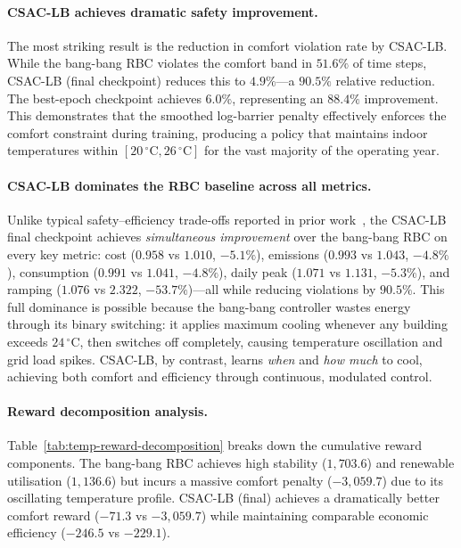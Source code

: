 \paragraph{CSAC-LB achieves dramatic safety improvement.}
The most striking result is the reduction in comfort violation rate by CSAC-LB.
While the bang-bang RBC violates the comfort band in $51.6\%$ of time steps,
CSAC-LB (final checkpoint) reduces this to $4.9\%$---a $90.5\%$ relative
reduction.  The best-epoch checkpoint achieves $6.0\%$, representing an
$88.4\%$ improvement.  This demonstrates that the smoothed log-barrier penalty
effectively enforces the comfort constraint during training, producing a policy
that maintains indoor temperatures within $[20\,^\circ\text{C},
26\,^\circ\text{C}]$ for the vast majority of the operating year.

\paragraph{CSAC-LB dominates the RBC baseline across all metrics.}
Unlike typical safety--efficiency trade-offs reported in prior
work~\cite{zhang2024csaclb}, the CSAC-LB final checkpoint achieves
\emph{simultaneous improvement} over the bang-bang RBC on every key metric:
cost ($0.958$ vs $1.010$, $-5.1\%$), emissions ($0.993$ vs $1.043$,
$-4.8\%$), consumption ($0.991$ vs $1.041$, $-4.8\%$), daily peak ($1.071$
vs $1.131$, $-5.3\%$), and ramping ($1.076$ vs $2.322$, $-53.7\%$)---all
while reducing violations by $90.5\%$.  This full dominance is possible
because the bang-bang controller wastes energy through its binary switching:
it applies maximum cooling whenever any building exceeds $24\,^\circ$C, then
switches off completely, causing temperature oscillation and grid load spikes.
CSAC-LB, by contrast, learns \emph{when} and \emph{how much} to cool,
achieving both comfort and efficiency through continuous, modulated control.

\paragraph{Reward decomposition analysis.}
Table~\ref{tab:temp-reward-decomposition} breaks down the cumulative reward
components.  The bang-bang RBC achieves high stability ($1{,}703.6$) and
renewable utilisation ($1{,}136.6$) but incurs a massive comfort penalty
($-3{,}059.7$) due to its oscillating temperature profile.  CSAC-LB (final)
achieves a dramatically better comfort reward ($-71.3$ vs $-3{,}059.7$)
while maintaining comparable economic efficiency ($-246.5$ vs $-229.1$).

